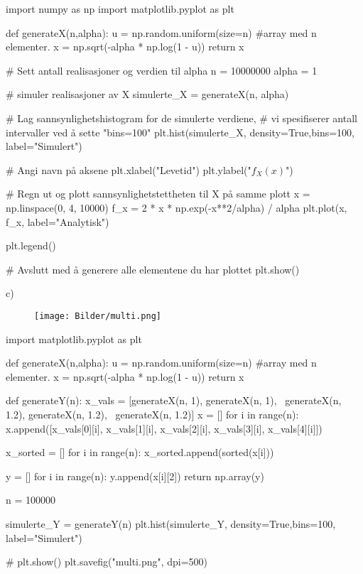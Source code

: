 \documentclass[a4paper,11pt,norsk]{article}
\begin{document}
\begin{pythoncode}
import numpy as np
import matplotlib.pyplot as plt

def generateX(n,alpha):
    u = np.random.uniform(size=n) #array med n elementer.
    x = np.sqrt(-alpha * np.log(1 - u))
    return x

# Sett antall realisasjoner og verdien til alpha
n = 10000000
alpha = 1

# simuler realisasjoner av X
simulerte_X = generateX(n, alpha)

# Lag sannsynlighetshistogram for de simulerte verdiene,
# vi spesifiserer antall intervaller ved å sette "bins=100"
plt.hist(simulerte_X, density=True,bins=100, label="Simulert")

# Angi navn på aksene
plt.xlabel("Levetid")
plt.ylabel("$f_X(x)$")

# Regn ut og plott sannsynlighetstettheten til X på samme plott
x = np.linspace(0, 4, 10000)
f_x = 2 * x * np.exp(-x**2/alpha) / alpha
plt.plot(x, f_x, label="Analytisk")

plt.legend()

# Avslutt med å generere alle elementene du har plottet
plt.show()
\end{pythoncode}

c) 

\begin{figure}[H]
    \centering
    \texttt{[image: Bilder/multi.png]}
\end{figure}

\begin{pythoncode}
 import matplotlib.pyplot as plt

def generateX(n,alpha):
    u = np.random.uniform(size=n) #array med n elementer.
    x = np.sqrt(-alpha * np.log(1 - u))
    return x

def generateY(n):
    x_vals = [generateX(n, 1), generateX(n, 1), \
              generateX(n, 1.2), generateX(n, 1.2), \
              generateX(n, 1.2)]
    x = []
    for i in range(n):
        x.append([x_vals[0][i], x_vals[1][i], x_vals[2][i], x_vals[3][i], x_vals[4][i]])
        
    x_sorted = []
    for i in range(n):
        x_sorted.append(sorted(x[i]))

    y = []
    for i in range(n):
        y.append(x[i][2])
    return np.array(y)

n = 100000

simulerte_Y = generateY(n)
plt.hist(simulerte_Y, density=True,bins=100, label="Simulert")

# plt.show()
plt.savefig("multi.png", dpi=500)
\end{pythoncode}
\end{document}
